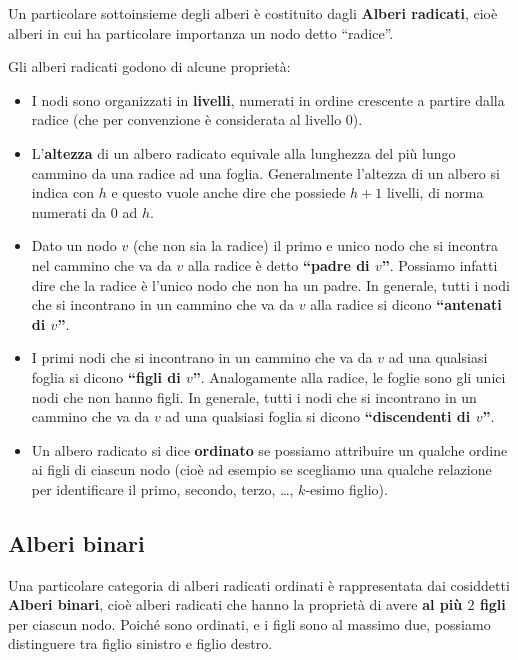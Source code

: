 \documentclass[12pt]{report}
\begin{document}
    \vspace{1em}
    Un particolare sottoinsieme degli alberi è costituito dagli \textbf{Alberi radicati}, cioè alberi in cui ha particolare importanza un nodo detto ``radice''.
    
    Gli alberi radicati godono di alcune proprietà:
    \begin{itemize}
    	\item I nodi sono organizzati in \textbf{livelli}, numerati in ordine crescente a partire dalla radice (che per convenzione è considerata al livello $0$).
    	\item L'\textbf{altezza} di un albero radicato equivale alla lunghezza del più lungo cammino da una radice ad una foglia. Generalmente l'altezza di un albero si indica con $h$ e questo vuole anche dire che possiede $h+1$ livelli, di norma numerati da $0$ ad $h$.
    	\item Dato un nodo $v$ (che non sia la radice) il primo e unico nodo che si incontra nel cammino che va da $v$ alla radice è detto \textbf{``padre di $v$''}. Possiamo infatti dire che la radice è l'unico nodo che non ha un padre. In generale, tutti i nodi che si incontrano in un cammino che va da $v$ alla radice si dicono \textbf{``antenati di $v$''}. 
    	\item I primi nodi che si incontrano in un cammino che va da $v$ ad una qualsiasi foglia si dicono \textbf{``figli di $v$''}. Analogamente alla radice, le foglie sono gli unici nodi che non hanno figli. In generale, tutti i nodi che si incontrano in un cammino che va da $v$ ad una qualsiasi foglia si dicono \textbf{``discendenti di $v$''}.
    	\item Un albero radicato si dice \textbf{ordinato} se possiamo attribuire un qualche ordine ai figli di ciascun nodo (cioè ad esempio se scegliamo una qualche relazione per identificare il primo, secondo, terzo, \dots, $k$-esimo figlio).
    \end{itemize}
    
    \subsection{Alberi binari}
    Una particolare categoria di alberi radicati ordinati è rappresentata dai cosiddetti \textbf{Alberi binari}, cioè alberi radicati che hanno la proprietà di avere \textbf{al più $2$ figli} per ciascun nodo. Poiché sono ordinati, e i figli sono al massimo due, possiamo distinguere tra figlio sinistro e figlio destro.
    
\end{document}
